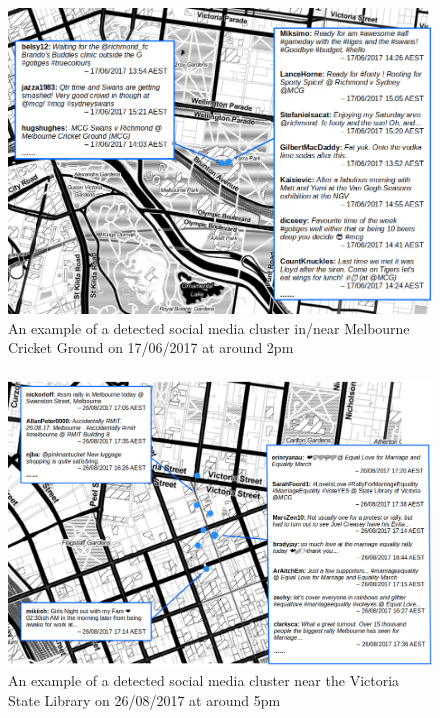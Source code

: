 \begin{frame}
    \frametitle{}
    \begin{figure}		  
    	\includegraphics[width=0.88\columnwidth]{resource/figures/cluster_1e.png}
    	\centering
    	\vspace{-0.2cm}
    	\caption{\tiny An example of a detected social media cluster in/near Melbourne Cricket Ground on 17/06/2017 at around 2pm}
    \end{figure}
\end{frame}

\begin{frame}
    \frametitle{}
    \begin{figure}		  
    	\includegraphics[width=0.95\columnwidth]{resource/figures/cluster_2e.png}
    	\centering
    	\vspace{-0.2cm}
    	\caption{\tiny An example of a detected social media cluster near the Victoria State Library on 26/08/2017 at around 5pm}
    \end{figure}
\end{frame}

